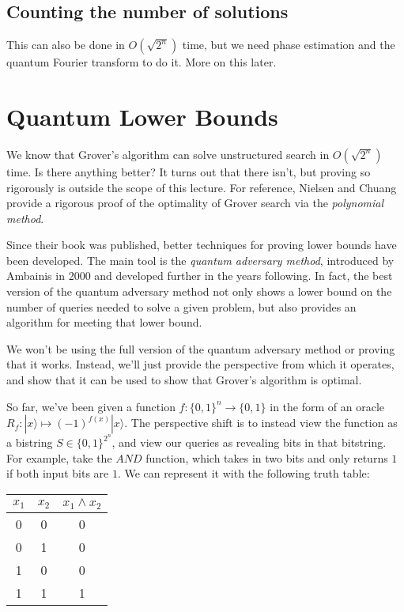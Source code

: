 \documentclass{article}
\newcommand{\ket}[1]{|#1\rangle}
\begin{document}
\subsection{Counting the number of solutions}

This can also be done in $O(\sqrt{2^n})$ time, but we need phase estimation and the quantum Fourier transform to do it. More on this later.

\section{Quantum Lower Bounds}

We know that Grover's algorithm can solve unstructured search in $O(\sqrt{2^n})$ time. Is there anything better? It turns out that there isn't, but proving so rigorously is outside the scope of this lecture. For reference, Nielsen and Chuang provide a rigorous proof of the optimality of Grover search via the \emph{polynomial method}.

Since their book was published, better techniques for proving lower bounds have been developed. The main tool is the \emph{quantum adversary method}, introduced by Ambainis in 2000 and developed further in the years following. In fact, the best version of the quantum adversary method not only shows a lower bound on the number of queries needed to solve a given problem, but also provides an algorithm for meeting that lower bound.

We won't be using the full version of the quantum adversary method or proving that it works. Instead, we'll just provide the perspective from which it operates, and show that it can be used to show that Grover's algorithm is optimal.

So far, we've been given a function $f : \{0, 1\}^n \to \{0, 1\}$ in the form of an oracle $R_f : \ket{x} \mapsto (-1)^{f(x)} \ket{x}$. The perspective shift is to instead view the function as a bistring $S \in \{0, 1\}^{2^n}$, and view our queries as revealing bits in that bitstring. For example, take the $AND$ function, which takes in two bits and only returns $1$ if both input bits are $1$. We can represent it with the following truth table:

\begin{tabular}{c|c|c}
$x_1$ & $x_2$ & $x_1 \wedge x_2$ \\
\hline
0 & 0 & 0 \\
0 & 1 & 0 \\
1 & 0 & 0 \\
1 & 1 & 1
\end{tabular}
\end{document}
